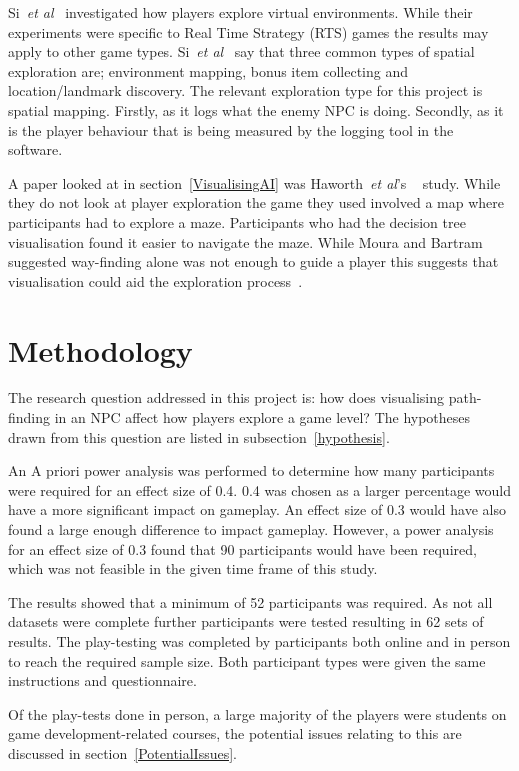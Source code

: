\documentclass[journal]{IEEEtran}
\begin{document}
	Si~\textit{et al}~\cite{si2017} investigated how players explore virtual environments. While their experiments were specific to Real Time Strategy (RTS) games the results may apply to other game types. Si~\textit{et al}~\cite{si2017} say that three common types of spatial exploration are; environment mapping, bonus item collecting and location/landmark discovery. The relevant exploration type for this project is spatial mapping. Firstly, as it logs what the enemy NPC is doing.  Secondly, as it is the player behaviour that is being measured by the logging tool in the software.
	
	A paper looked at in section~\ref{VisualisingAI} was Haworth~\textit{et al}'s ~\cite{Haworth2010} study. While they do not look at player exploration the game they used involved a map where participants had to explore a maze. Participants who had the decision tree visualisation found it easier to navigate the maze. While Moura and Bartram~\cite{moura2014} suggested way-finding alone was not enough to guide a player this suggests that visualisation could aid the exploration process~\cite{Haworth2010}.
	
	\section{Methodology} \label{methodology}
	The research question addressed in this project is: how does visualising path-finding in an NPC affect how players explore a game level? The hypotheses drawn from this question are listed in subsection~\ref{hypothesis}.  
	
	An A priori power analysis was performed to determine how many participants were required for an effect size of 0.4. 0.4 was chosen as a larger percentage would have a more significant impact on gameplay.  An effect size of 0.3 would have also found a large enough difference to impact gameplay. However, a power analysis for an effect size of 0.3 found that 90 participants would have been required, which was not feasible in the given time frame of this study.
	
	The results showed that a minimum of 52 participants was required. As not all datasets were complete further participants were tested resulting in 62 sets of results. The play-testing was completed by participants both online and in person to reach the required sample size. Both participant types were given the same instructions and questionnaire. 
	
	Of the play-tests done in person, a large majority of the players were students on game development-related courses, the potential issues relating to this are discussed in section~\ref{PotentialIssues}. 
	
\end{document}
